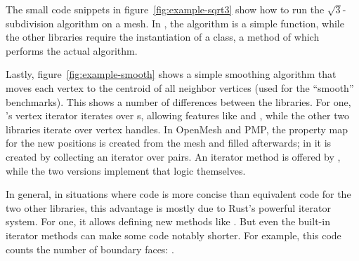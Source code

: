 The small code snippets in figure~\ref{fig:example-sqrt3} show how to run the $\sqrt{3}$-subdivision algorithm \cite{kobbelt20003} on a mesh.
In , the algorithm is a simple function, while the other libraries require the instantiation of a class, a method of which performs the actual algorithm.

Lastly, figure~\ref{fig:example-smooth} shows a simple smoothing algorithm that moves each vertex to the centroid of all neighbor vertices (used for the \enquote{smooth} benchmarks).
This shows a number of differences between the libraries.
For one, 's vertex iterator iterates over s, allowing features like  and , while the other two libraries iterate over vertex handles.
In OpenMesh and PMP, the property map for the new positions is created from the mesh and filled afterwards; in  it is created by collecting an iterator over  pairs.
An iterator method  is offered by , while the two \cpp versions implement that logic themselves.

In general, in situations where  code is more concise than equivalent code for the two other libraries, this advantage is mostly due to Rust's powerful iterator system.
For one, it allows defining new methods like .
But even the built-in iterator methods can make some code notably shorter.
For example, this code counts the number of boundary faces: .


